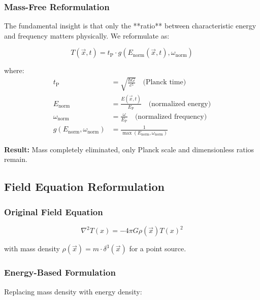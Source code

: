 \documentclass[12pt,a4paper]{article}
\newcommand{\Tfield}{T(x)}
\newcommand{\Tfieldt}{T(\vec{x},t)}
\newcommand{\vecx}{\vec{x}}
\newcommand{\tP}{t_{\text{P}}}
\newcommand{\EP}{E_{\text{P}}}
\begin{document}
	\subsubsection{Mass-Free Reformulation}
	
	The fundamental insight is that only the **ratio** between characteristic energy and frequency matters physically. We reformulate as:
	
	\begin{equation}
		\boxed{\Tfieldt = \tP \cdot g(E_{\text{norm}}(\vecx,t), \omega_{\text{norm}})}
		\label{eq:time_field_mass_free}
	\end{equation}
	
	where:
	\begin{align}
		\tP &= \sqrt{\frac{\hbar G}{c^5}} \quad \text{(Planck time)} \\
		E_{\text{norm}} &= \frac{E(\vecx,t)}{\EP} \quad \text{(normalized energy)} \\
		\omega_{\text{norm}} &= \frac{\omega}{\EP} \quad \text{(normalized frequency)} \\
		g(E_{\text{norm}}, \omega_{\text{norm}}) &= \frac{1}{\max(E_{\text{norm}}, \omega_{\text{norm}})}
	\end{align}
	
	\textbf{Result:} Mass completely eliminated, only Planck scale and dimensionless ratios remain.
	
	\subsection{Field Equation Reformulation}
	\label{subsec:field_equation_elimination}
	
	\subsubsection{Original Field Equation}
	
	\begin{equation}
		\nabla^2 \Tfield = -4\pi G \rho(\vecx) \Tfield^2
		\label{eq:field_equation_original}
	\end{equation}
	
	with mass density $\rho(\vecx) = m \cdot \delta^3(\vecx)$ for a point source.
	
	\subsubsection{Energy-Based Formulation}
	
	Replacing mass density with energy density:
	
\end{document}

